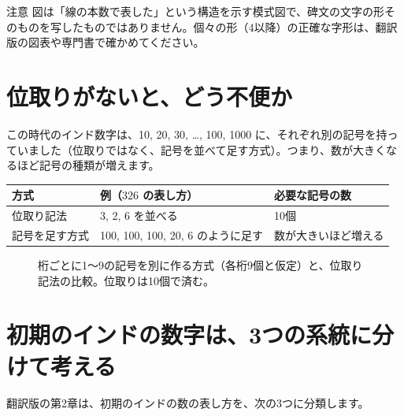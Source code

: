 \documentclass[a4paper,11pt,openany]{ltjsbook}
\begin{document}
\begin{notebox}{注意}
図は「線の本数で表した」という構造を示す模式図で、碑文の文字の形そのものを写したものではありません。個々の形（4以降）の正確な字形は、翻訳版の図表や専門書で確かめてください。
\end{notebox}

\section{位取りがないと、どう不便か}

この時代のインド数字は、10, 20, 30, …, 100, 1000 に、それぞれ別の記号を持っていました（位取りではなく、記号を並べて足す方式）。つまり、数が大きくなるほど記号の種類が増えます。

\begin{center}
\begin{tabular}{lll}
\toprule
方式 & 例（$326$ の表し方） & 必要な記号の数\\
\midrule
位取り記法 & 3, 2, 6 を並べる & 10個\\
記号を足す方式 & 100, 100, 100, 20, 6 のように足す & 数が大きいほど増える\\
\bottomrule
\end{tabular}
\end{center}

\begin{figure}[htbp]
\centering
{}
\caption{桁ごとに1〜9の記号を別に作る方式（各桁9個と仮定）と、位取り記法の比較。位取りは10個で済む。}
\end{figure}

\section{初期のインドの数字は、3つの系統に分けて考える}

翻訳版の第2章は、初期のインドの数の表し方を、次の3つに分類します。
\end{document}
